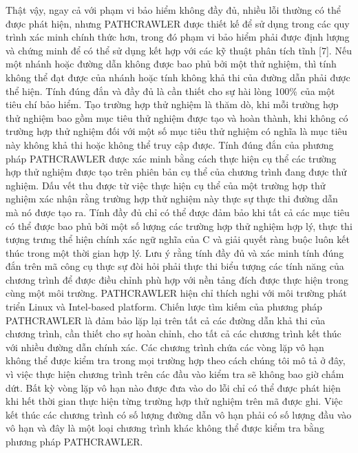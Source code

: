 \documentclass[12pt,a4paper]{article}
\begin{document}
\indent Thật vậy, ngay cả với phạm vi bảo hiểm không đầy đủ, nhiều lỗi thường có thể được phát hiện, nhưng PATHCRAWLER được thiết kế để sử dụng trong các quy trình xác minh chính thức hơn, trong đó phạm vi bảo hiểm phải được định lượng và chứng minh để có thể sử dụng kết hợp với các kỹ thuật phân tích tĩnh [7]. Nếu một nhánh hoặc đường dẫn không được bao phủ bởi một thử nghiệm, thì tính không thể đạt được của nhánh hoặc tính không khả thi của đường dẫn phải được thể hiện. Tính đúng đắn và đầy đủ là cần thiết cho sự hài lòng 100\% của một tiêu chí bảo hiểm. Tạo trường hợp thử nghiệm là thăm dò, khi mỗi trường hợp thử nghiệm bao gồm mục tiêu thử nghiệm được tạo và hoàn thành, khi không có trường hợp thử nghiệm đối với một số mục tiêu thử nghiệm có nghĩa là mục tiêu này không khả thi hoặc không thể truy cập được.\newline
\indent Tính đúng đắn của phương pháp PATHCRAWLER được xác minh bằng cách thực hiện cụ thể các trường hợp thử nghiệm được tạo trên phiên bản cụ thể của chương trình đang được thử nghiệm. Dấu vết thu được từ việc thực hiện cụ thể của một trường hợp thử nghiệm xác nhận rằng trường hợp thử nghiệm này thực sự thực thi đường dẫn mà nó được tạo ra.\newline
\indent Tính đầy đủ chỉ có thể được đảm bảo khi tất cả các mục tiêu có thể được bao phủ bởi một số lượng các trường hợp thử nghiệm hợp lý, thực thi tượng trưng thể hiện chính xác ngữ nghĩa của C và giải quyết ràng buộc luôn kết thúc trong một thời gian hợp lý. Lưu ý rằng tính đầy đủ và xác minh tính đúng đắn trên mã công cụ thực sự đòi hỏi phải thực thi biểu tượng các tính năng của chương trình để được điều chỉnh phù hợp với nền tảng đích được thực hiện trong cùng một môi trường. PATHCRAWLER hiện chỉ thích nghi với môi trường phát triển Linux và Intel-based platform. Chiến lược tìm kiếm của phương pháp PATHCRAWLER là đảm bảo lặp lại trên tất cả các đường dẫn khả thi của chương trình, cần thiết cho sự hoàn chỉnh, cho tất cả các chương trình kết thúc với nhiều đường dẫn chính xác. Các chương trình chứa các vòng lặp vô hạn không thể được kiểm tra trong mọi trường hợp theo cách chúng tôi mô tả ở đây, vì việc thực hiện chương trình trên các đầu vào kiểm tra sẽ không bao giờ chấm dứt. Bất kỳ vòng lặp vô hạn nào được đưa vào do lỗi chỉ có thể được phát hiện khi hết thời gian thực hiện từng trường hợp thử nghiệm trên mã được ghi. Việc kết thúc các chương trình có số lượng đường dẫn vô hạn phải có số lượng đầu vào vô hạn và đây là một loại chương trình khác không thể được kiểm tra bằng phương pháp PATHCRAWLER.\newline
\end{document}
